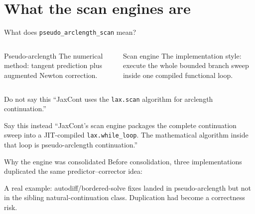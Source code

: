 \documentclass[aspectratio=169,10pt]{beamer}
\begin{document}
\section{What the scan engines are}

\begin{frame}{What does \texttt{pseudo\_arclength\_scan} mean?}
\begin{columns}[T]
\begin{block}{Pseudo-arclength}
The numerical method: tangent prediction plus augmented Newton correction.
\end{block}
\begin{block}{Scan engine}
The implementation style: execute the whole bounded branch sweep inside one compiled functional loop.
\end{block}
\end{columns}
\vspace{5mm}
\begin{alertblock}{Do not say this}
``JaxCont uses the \texttt{lax.scan} algorithm for arclength continuation.''
\end{alertblock}
\begin{block}{Say this instead}
``JaxCont's scan engine packages the complete continuation sweep into a JIT-compiled \texttt{lax.while\_loop}. The mathematical algorithm inside that loop is pseudo-arclength continuation.''
\end{block}
\end{frame}

\begin{frame}{Why the engine was consolidated}
Before consolidation, three implementations duplicated the same predictor--corrector idea:
\begin{center}
\end{center}
A real example: autodiff/bordered-solve fixes landed in pseudo-arclength but not in the sibling natural-continuation class. Duplication had become a correctness risk.
\end{frame}
\end{document}

